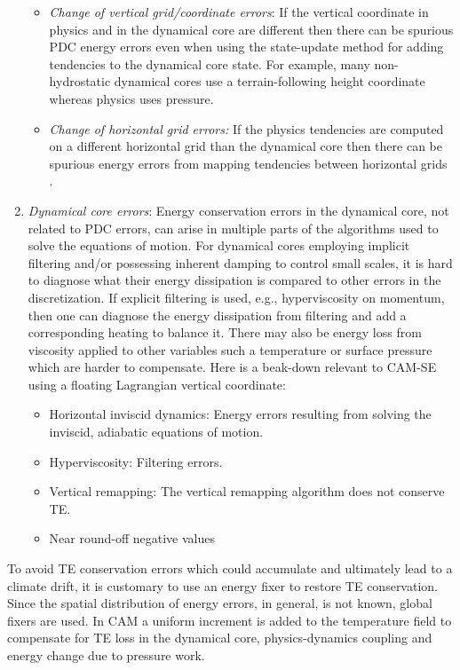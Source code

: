 \documentclass{agujournal}
\begin{document}
\begin{enumerate}
\begin{itemize}
\item {\em{Change of vertical grid/coordinate errors}}: If the vertical coordinate in physics and in the dynamical core are different then there can be spurious PDC energy errors even when using the state-update method for adding tendencies to the dynamical core state. For example, many non-hydrostatic dynamical cores \citep[e.g. MPAS, ]{MPASatm} use a terrain-following height coordinate whereas physics uses pressure.
\item {\em{Change of horizontal grid errors:}} If the physics tendencies are computed on a different horizontal grid than the dynamical core then there can be spurious energy errors from mapping tendencies between horizontal grids \citep[e.g., ][]{HetAl2018MWR}. 
\end{itemize}
\item {\em{Dynamical core errors}}: Energy conservation errors in the dynamical core, not related to PDC errors, can arise in multiple parts of the algorithms used to solve the equations of motion. For dynamical cores employing implicit filtering \citep[e.g., limiters in flux operators ][]{L2004MWR} and/or possessing inherent damping to control small scales, it is hard to diagnose what their energy dissipation is compared to other errors in the discretization. If explicit filtering is used, e.g., hyperviscosity on momentum, then one can diagnose the energy dissipation from filtering and add a corresponding heating to balance it. There may also be energy loss from viscosity applied to other variables such a temperature or surface pressure which are harder to compensate. Here is a beak-down relevant to CAM-SE using a floating Lagrangian vertical coordinate:
\begin{itemize}
\item Horizontal inviscid dynamics: Energy errors resulting from solving the inviscid, adiabatic equations of motion.
\item Hyperviscosity: Filtering errors.
\item Vertical remapping: The vertical remapping algorithm does not conserve TE.
\item Near round-off negative values
\end{itemize}
\end{enumerate}
To avoid TE conservation errors which could accumulate and ultimately lead to a climate drift, it is customary to use an energy fixer to restore TE conservation. Since the spatial distribution of energy errors, in general, is not known, global fixers are used. In CAM a uniform increment is added to the temperature field to compensate for TE loss in the dynamical core, physics-dynamics coupling and energy change due to pressure work. 
%
\end{document}
